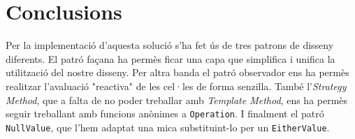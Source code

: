 \documentclass{article}
\begin{document}
	\section{Conclusions}%
Per la implementació d'aquesta solució s'ha fet ús de tres patrons de disseny diferents. El patró façana 
ha permès ficar una capa que simplifica i unifica la utilització del nostre disseny. Per altra banda 
el patró observador ens ha permès realitzar l'avaluació "reactiva" de les cel·les de forma senzilla. També 
l'\textit{Strategy Method}, que a falta de no poder treballar amb \textit{Template Method}, ens ha permès 
seguir treballant amb funcions anònimes a \texttt{Operation}. I finalment el patró \texttt{NullValue}, que l'hem 
adaptat una mica substituint-lo per un \texttt{EitherValue}.
\end{document}

